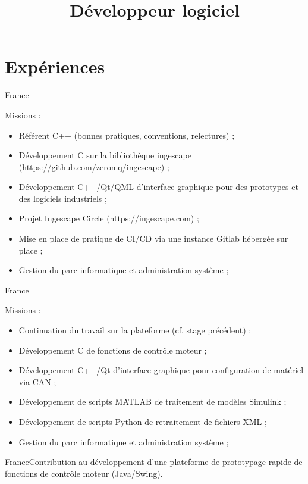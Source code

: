 \documentclass[10pt,a4paper]{moderncv}
\title{Développeur logiciel}
\begin{document}
\maketitle
\thispagestyle{empty}
\section{Expériences}
{France}{Missions :
\begin{itemize}
  \item{Référent C++ (bonnes pratiques, conventions, relectures) ;}
  \item{Développement C sur la bibliothèque ingescape (https://github.com/zeromq/ingescape) ;}
  \item{Développement C++/Qt/QML d'interface graphique pour des prototypes et des logiciels industriels ;}
  \item{Projet Ingescape Circle (https://ingescape.com) ;}
  \item{Mise en place de pratique de CI/CD via une instance Gitlab hébergée sur place ;}
  \item{Gestion du parc informatique et administration système ;}
\end{itemize}}
{France}{Missions :
\begin{itemize}
  \item{Continuation du travail sur la plateforme (cf. stage précédent) ;}
  \item{Développement C de fonctions de contrôle moteur ;}
  \item{Développement C++/Qt d'interface graphique pour configuration de matériel via CAN ;}
  \item{Développement de scripts MATLAB de traitement de modèles Simulink ;}
  \item{Développement de scripts Python de retraitement de fichiers XML ;}
  \item{Gestion du parc informatique et administration système ;}
\end{itemize}}
{France}{Contribution au développement d'une plateforme de prototypage rapide de fonctions
de contrôle moteur (Java/Swing).}
\end{document}
